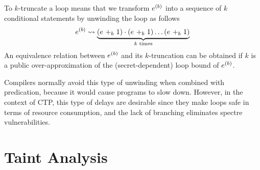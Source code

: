 \begin{definition}[$k$-Truncation]
To $k$-truncate a loop means that we transform $\iterate{b}{e}$ into a sequence of $k$ conditional statements by unwinding the loop as follows
\begin{align*}
\iterate{b}{e} \leadsto \underbrace{\left(\branch{b}{e}{1}\right)\cdot\left(\branch{b}{e}{1}\right)\ldots\left(\branch{b}{e}{1}\right)}_\text{$k$ times}
\end{align*}
An equivalence relation between $\iterate{b}{e}$ and its $k$-truncation can be obtained if $k$ is a public over-approximation of the (secret-dependent) loop bound of $\iterate{b}{e}$.

Compilers normally avoid this type of unwinding when combined with predication, because it would cause programs to slow down. However, in the context of CTP, this type of delays are desirable since they make loops safe in terms of resource consumption, and the lack of branching eliminates spectre vulnerabilities.

\end{definition}

\section{Taint Analysis}


